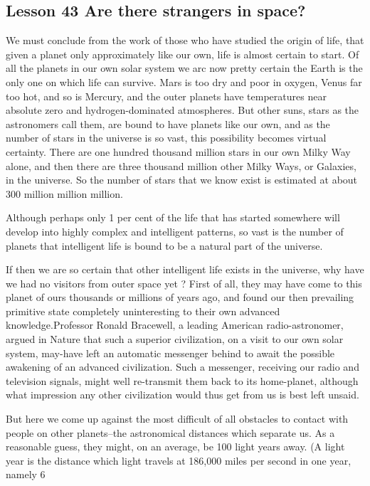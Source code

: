 \documentclass[kindlepaper]{BHCexam4kindle}
\begin{document}
\subsection{Lesson 43
Are there strangers in space?}
\par
We must conclude from the work of those who have studied the origin of life, that given a planet only
approximately like our own, life is almost certain to start. Of all the planets in our own solar system we arc
now pretty certain the Earth is the only one on which life can survive. Mars is too dry and poor in oxygen,
Venus far too hot, and so is Mercury, and the outer planets have temperatures near absolute zero and
hydrogen-dominated atmospheres. But other suns, stars as the astronomers call them, are bound to have planets
like our own, and as the number of stars in the universe is so vast, this possibility becomes virtual certainty.
There are one hundred thousand million stars in our own Milky Way alone, and then there are three thousand
million other Milky Ways, or Galaxies, in the universe. So the number of stars that we know exist is estimated
at about 300 million million million.
\par
Although perhaps only 1 per cent of the life that has started somewhere will develop into highly complex
and intelligent patterns, so vast is the number of planets that intelligent life is bound to be a natural part of the
universe.
\par
If then we are so certain that other intelligent life exists in the universe, why have we had no visitors from
outer space yet ? First of all, they may have come to this planet of ours thousands or millions of years ago, and
found our then prevailing primitive state completely uninteresting to their own advanced knowledge.Professor
Ronald Bracewell, a leading American radio-astronomer, argued in Nature that such a superior civilization, on
a visit to our own solar system, may-have left an automatic messenger behind to await the possible awakening
of an advanced civilization. Such a messenger, receiving our radio and television signals, might well
re-transmit them back to its home-planet, although what impression any other civilization would thus get from
us is best left unsaid.
\par
But here we come up against the most difficult of all obstacles to contact with people on other planets--the
astronomical distances which separate us. As a reasonable guess, they might, on an average, be 100 light years
away. (A light year is the distance which light travels at 186,000 miles per second in one year, namely 6
\end{document}
